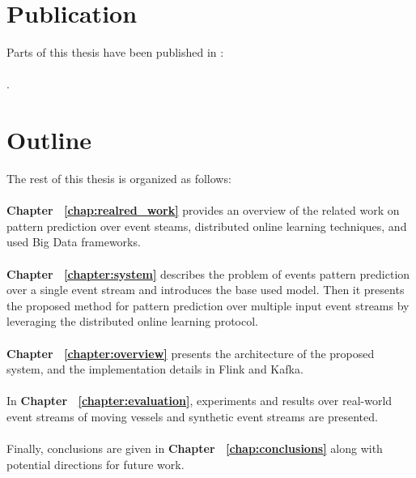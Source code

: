\newpage
\section{Publication}

Parts of this thesis have been published in \cite{Qadah}:\\ \\
.

\section{Outline }

	
\par The rest of this thesis is organized as follows:\\
\\
\textbf{Chapter ~\ref{chap:realred_work}} provides an overview of the related work on pattern prediction over event steams, distributed online learning techniques, and used Big Data frameworks.
\\
\\
\textbf{Chapter ~\ref{chapter:system}} describes the problem of events pattern prediction over a single event stream and introduces the base used model. Then it presents the proposed method for pattern prediction over multiple input event streams by leveraging the distributed online learning protocol. 
\\
\\
\textbf{Chapter ~\ref{chapter:overview}}  presents the architecture of the proposed system, and the implementation details in Flink and Kafka.
\\
\\
In \textbf{Chapter ~\ref{chapter:evaluation}}, experiments and results over real-world event streams of moving vessels and synthetic event streams are presented.
\\
\\
Finally, conclusions are given in \textbf{Chapter ~\ref{chap:conclusions}} along with potential directions for future work.




